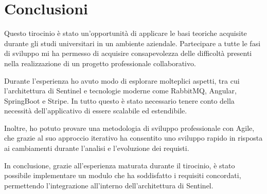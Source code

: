 \chapter{Conclusioni}
Questo tirocinio \`e stato un'opportunit\`a di applicare le basi teoriche acquisite durante gli studi universitari in un ambiente aziendale.
Partecipare a tutte le fasi di sviluppo mi ha permesso di acquisire consapevolezza delle difficolt\`a presenti nella realizzazione di un progetto professionale collaborativo.

Durante l'esperienza ho avuto modo di esplorare molteplici aspetti, tra cui l'architettura di Sentinel e tecnologie moderne come RabbitMQ, Angular, SpringBoot e Stripe.
In tutto questo \`e stato necessario tenere conto della necessit\`a dell'applicativo di essere scalabile ed estendibile.

Inoltre, ho potuto provare una metodologia di sviluppo professionale con Agile, che grazie al suo approccio iterativo ha consentito uno sviluppo rapido
in risposta ai cambiamenti durante l'analisi e l'evoluzione dei requisti.

In conclusione, grazie all'esperienza maturata durante il tirocinio, \`e stato possibile implementare un modulo che ha soddisfatto i requisiti concordati, permettendo
l'integrazione all'interno dell'architettura di Sentinel.
